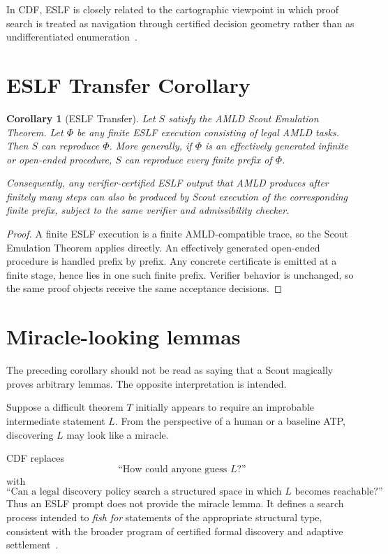 \documentclass[11pt]{article}
\newtheorem{corollary}[theorem]{Corollary}
\theoremstyle{definition}
\begin{document}
In CDF, ESLF is closely related to the cartographic viewpoint in which proof search is treated as navigation through certified decision geometry rather than as undifferentiated enumeration~\cite{tenneson-cartographers,tenneson-geodesic,tenneson-cartography}.


\section{ESLF Transfer Corollary}

\begin{corollary}[ESLF Transfer]
Let $S$ satisfy the AMLD Scout Emulation Theorem. Let $\Phi$ be any finite ESLF execution consisting of legal AMLD tasks. Then $S$ can reproduce $\Phi$. More generally, if $\Phi$ is an effectively generated infinite or open-ended procedure, $S$ can reproduce every finite prefix of $\Phi$.

Consequently, any verifier-certified ESLF output that AMLD produces after finitely many steps can also be produced by Scout execution of the corresponding finite prefix, subject to the same verifier and admissibility checker.
\end{corollary}

\begin{proof}
A finite ESLF execution is a finite AMLD-compatible trace, so the Scout Emulation Theorem applies directly. An effectively generated open-ended procedure is handled prefix by prefix. Any concrete certificate is emitted at a finite stage, hence lies in one such finite prefix. Verifier behavior is unchanged, so the same proof objects receive the same acceptance decisions.
\end{proof}


\section{Miracle-looking lemmas}

The preceding corollary should not be read as saying that a Scout magically proves arbitrary lemmas. The opposite interpretation is intended.

Suppose a difficult theorem $T$ initially appears to require an improbable intermediate statement $L$. From the perspective of a human or a baseline ATP, discovering $L$ may look like a miracle.

CDF replaces
\[
\text{``How could anyone guess }L\text{?''}
\]
with
\[
\text{``Can a legal discovery policy search a structured space in which }L\text{ becomes reachable?''}
\]
Thus an ESLF prompt does not provide the miracle lemma. It defines a search process intended to \emph{fish for} statements of the appropriate structural type, consistent with the broader program of certified formal discovery and adaptive settlement~\cite{tenneson-personal,tenneson-imagination}.
\end{document}
